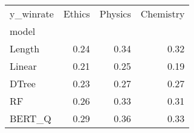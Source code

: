 \begin{tabular}{lrrr}
\toprule
y\_winrate &  Ethics &  Physics &  Chemistry \\
model  &         &          &            \\
\midrule
Length &    0.24 &     0.34 &       0.32 \\
Linear &    0.21 &     0.25 &       0.19 \\
DTree  &    0.23 &     0.27 &       0.27 \\
RF     &    0.26 &     0.33 &       0.31 \\
BERT\_Q &    0.29 &     0.36 &       0.33 \\
\bottomrule
\end{tabular}
